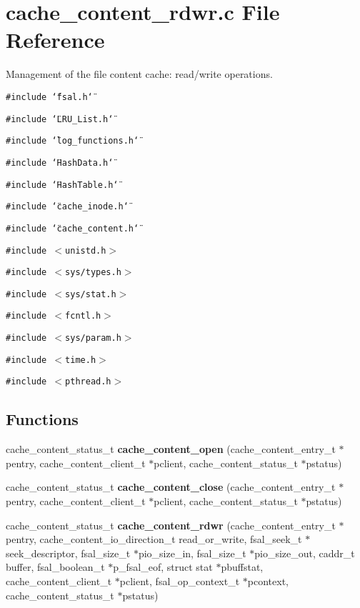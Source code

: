 \section{cache\_\-content\_\-rdwr.c File Reference}
\label{cache__content__rdwr_8c}
Management of the file content cache: read/write operations.  


{\tt \#include \char`\"{}fsal.h\char`\"{}}\par
{\tt \#include \char`\"{}LRU\_\-List.h\char`\"{}}\par
{\tt \#include \char`\"{}log\_\-functions.h\char`\"{}}\par
{\tt \#include \char`\"{}HashData.h\char`\"{}}\par
{\tt \#include \char`\"{}HashTable.h\char`\"{}}\par
{\tt \#include \char`\"{}cache\_\-inode.h\char`\"{}}\par
{\tt \#include \char`\"{}cache\_\-content.h\char`\"{}}\par
{\tt \#include $<$unistd.h$>$}\par
{\tt \#include $<$sys/types.h$>$}\par
{\tt \#include $<$sys/stat.h$>$}\par
{\tt \#include $<$fcntl.h$>$}\par
{\tt \#include $<$sys/param.h$>$}\par
{\tt \#include $<$time.h$>$}\par
{\tt \#include $<$pthread.h$>$}\par
\subsection*{Functions}
\begin{CompactItemize}
\item 
cache\_\-content\_\-status\_\-t {\bf cache\_\-content\_\-open} (cache\_\-content\_\-entry\_\-t $\ast$pentry, cache\_\-content\_\-client\_\-t $\ast$pclient, cache\_\-content\_\-status\_\-t $\ast$pstatus)
\item 
cache\_\-content\_\-status\_\-t {\bf cache\_\-content\_\-close} (cache\_\-content\_\-entry\_\-t $\ast$pentry, cache\_\-content\_\-client\_\-t $\ast$pclient, cache\_\-content\_\-status\_\-t $\ast$pstatus)
\item 
cache\_\-content\_\-status\_\-t {\bf cache\_\-content\_\-rdwr} (cache\_\-content\_\-entry\_\-t $\ast$pentry, cache\_\-content\_\-io\_\-direction\_\-t read\_\-or\_\-write, fsal\_\-seek\_\-t $\ast$seek\_\-descriptor, fsal\_\-size\_\-t $\ast$pio\_\-size\_\-in, fsal\_\-size\_\-t $\ast$pio\_\-size\_\-out, caddr\_\-t buffer, fsal\_\-boolean\_\-t $\ast$p\_\-fsal\_\-eof, struct stat $\ast$pbuffstat, cache\_\-content\_\-client\_\-t $\ast$pclient, fsal\_\-op\_\-context\_\-t $\ast$pcontext, cache\_\-content\_\-status\_\-t $\ast$pstatus)
\end{CompactItemize}


